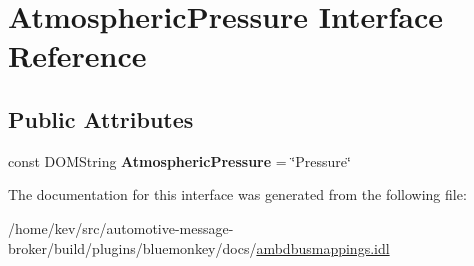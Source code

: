 \hypertarget{interfaceAtmosphericPressure}{\section{Atmospheric\+Pressure Interface Reference}
\label{interfaceAtmosphericPressure}
}
\subsection*{Public Attributes}
\begin{DoxyCompactItemize}
\item 
\hypertarget{interfaceAtmosphericPressure_a32fe278d370cc25bb8ce6485f9654ecf}{const D\+O\+M\+String {\bfseries Atmospheric\+Pressure} = \char`\"{}Pressure\char`\"{}}\label{interfaceAtmosphericPressure_a32fe278d370cc25bb8ce6485f9654ecf}

\end{DoxyCompactItemize}


The documentation for this interface was generated from the following file\+:\begin{DoxyCompactItemize}
\item 
/home/kev/src/automotive-\/message-\/broker/build/plugins/bluemonkey/docs/\hyperlink{ambdbusmappings_8idl}{ambdbusmappings.\+idl}\end{DoxyCompactItemize}
